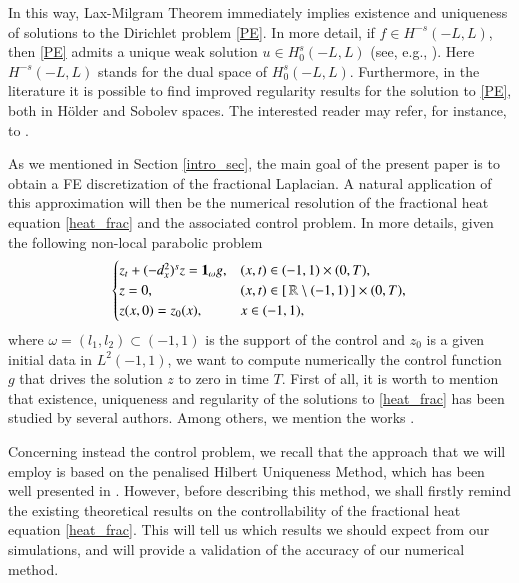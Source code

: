 In this way, Lax-Milgram Theorem immediately implies existence and uniqueness of solutions to the Dirichlet problem \eqref{PE}. In more detail, if $f\in H^{-s}(-L,L)$, then \eqref{PE} admits a unique weak solution $u\in H_0^s(-L,L)$ (see, e.g., \cite[Proposition 2.1]{biccari2017local}). Here $H^{-s}(-L,L)$ stands for the dual space of $H^s_0(-L,L)$. Furthermore, in the literature it is possible to find improved regularity results for the solution to \eqref{PE}, both in H\"older and Sobolev spaces. The interested reader may refer, for instance, to \cite{acosta2017fractional,biccari2017local,leonori2015basic,ros2014dirichlet,ros2014extremal}.

As we mentioned in Section \ref{intro_sec}, the main goal of the present paper is to obtain a FE discretization of the fractional Laplacian. A natural application of this approximation will then be the numerical resolution of the fractional heat equation \ref{heat_frac} and the associated control problem. In more details, given the following non-local parabolic problem 
\begin{align*}
	\begin{cases}
		z_t+(-d_x^2)^{s}z =\mathbf{1}_\omega g, & (x,t)\in (-1,1)\times (0,T), 
		\\
		z=0, & (x,t)\in [\,\mathbb{R} \setminus (-1,1)\,]\times (0,T), 
		\\
		z(x,0)=z_0(x), & x\in (-1,1),
	\end{cases}
\end{align*}
where $\omega=(l_1,l_2)\subset (-1,1)$ is the support of the control and $z_0$ is a given initial data in $L^2(-1,1)$, we want to compute numerically the control function $g$ that drives the solution $z$ to zero in time $T$. First of all, it is worth to mention that existence, uniqueness and regularity of the solutions to \eqref{heat_frac} has been studied by several authors. Among others, we mention the works \cite{biccari2017local,fernandez2016boundary,leonori2015basic}.

Concerning instead the control problem, we recall that the approach that we will employ is based on the penalised Hilbert Uniqueness Method, which has been well presented in \cite{boyer2013penalised}. However, before describing this method, we shall firstly remind the existing theoretical results on the controllability of the fractional heat equation \eqref{heat_frac}. This will tell us which results we should expect from our simulations, and will provide a validation of the accuracy of our numerical method.

